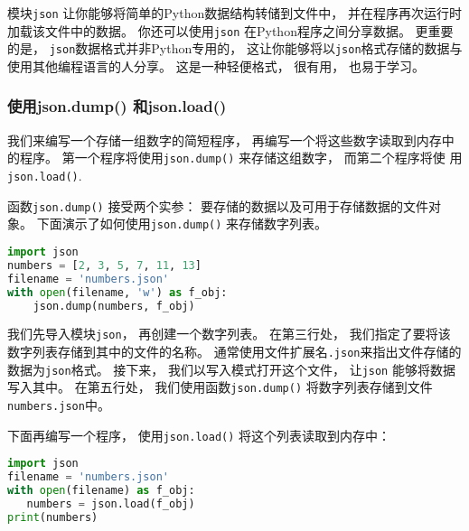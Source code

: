 模块\verb`json` 让你能够将简单的Python数据结构转储到文件中， 并在程序再次运行时加载该文件中的数据。 你还可以使用\verb`json` 在Python程序之间分享数据。 更重要的是， \verb`json`数据格式并非Python专用的， 这让你能够将以\verb`json`格式存储的数据与使用其他编程语言的人分享。 这是一种轻便格式， 很有用， 也易于学习。

\subsubsection{使用json.dump() 和json.load()}
我们来编写一个存储一组数字的简短程序， 再编写一个将这些数字读取到内存中的程序。 第一个程序将使用\verb`json.dump()` 来存储这组数字， 而第二个程序将使
用\verb`json.load()`.

函数\verb`json.dump()` 接受两个实参： 要存储的数据以及可用于存储数据的文件对象。 下面演示了如何使用\verb`json.dump()` 来存储数字列表。
\begin{lstlisting}[language=python]
import json
numbers = [2, 3, 5, 7, 11, 13]
filename = 'numbers.json'
with open(filename, 'w') as f_obj:
    json.dump(numbers, f_obj)
\end{lstlisting}
我们先导入模块\verb`json`， 再创建一个数字列表。 在第三行处， 我们指定了要将该数字列表存储到其中的文件的名称。 通常使用文件扩展名\verb`.json`来指出文件存储的数据为\verb`json`格式。 接下来， 我们以写入模式打开这个文件， 让\verb`json` 能够将数据写入其中。 在第五行处， 我们使用函数\verb`json.dump()` 将数字列表存储到文件\verb`numbers.json`中。

下面再编写一个程序， 使用\verb`json.load()` 将这个列表读取到内存中：

\begin{lstlisting}[language=python]
import json
filename = 'numbers.json'
with open(filename) as f_obj:
   numbers = json.load(f_obj)
print(numbers)
\end{lstlisting}
